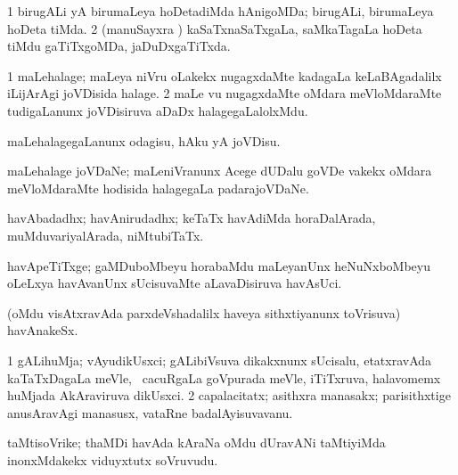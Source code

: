 \bentry
{} 
\gl{\gu}
\expl{}
\bmng
\bnum
\num{1} birugALi yA birumaLeya hoDetadiMda hAnigoMDa; birugALi, birumaLeya hoDeta tiMda. 
\num{2} (manuSayxra \vi) kaSaTxnaSaTxgaLa, saMkaTagaLa hoDeta tiMdu gaTiTxgoMDa, jaDuDxgaTiTxda. 
\enum
\emng
\eentry

\bentry
{} 
\gl{\nA}
\expl{}
\bmng
\bnum
\num{1} maLehalage; maLeya niVru oLakekx nugagxdaMte kadagaLa keLaBAgadalilx iLijArAgi joVDisida halage. 
\num{2} maLe \mo vu nugagxdaMte oMdara meVloMdaraMte tudigaLanunx joVDisiruva aDaDx halagegaLalolxMdu. 
\enum
\emng
\eentry

\bentry
{} 
\gl{\sakirx}
\expl{}
\bmng
maLehalagegaLanunx odagisu, hAku yA joVDisu. 
\emng
\eentry

\bentry
{} 
\gl{\nA}
\expl{}
\bmng
maLehalage joVDaNe; maLeniVranunx Acege dUDalu goVDe \mo vakekx oMdara meVloMdaraMte hodisida halagegaLa padarajoVDaNe. 
\emng
\eentry

\bentry
{} 
\gl{\gu}
\expl{}
\bmng
havAbadadhx; havAnirudadhx; keTaTx havAdiMda horaDalArada, muMduvariyalArada, niMtubiTaTx. 
\emng
\eentry

\bentry
{} 
\gl{\nA}
\expl{}
\bmng
havApeTiTxge; gaMDuboMbeyu horabaMdu maLeyanUnx heNuNxboMbeyu oLeLxya havAvanUnx sUcisuvaMte aLavaDisiruva havAsUci. 
\emng
\eentry

\bentry
{} 
\gl{\nA}
\expl{}
\bmng
(oMdu visAtxravAda parxdeVshadalilx haveya sithxtiyanunx toVrisuva) havAnakeSx. 
\emng
\eentry

{} 
\gl{\nA}
\expl{}
\bmng
\bnum
\num{1} gALihuMja; vAyudikUsxci; gALibiVsuva dikakxnunx sUcisalu, etatxravAda kaTaTxDagaLa meVle, \kanmu\ cacuRgaLa goVpurada meVle, iTiTxruva, halavomemx huMjada AkAraviruva dikUsxci.  
\num{2} capalacitatx; asithxra manasakx; parisithxtige anusAravAgi manasusx, vataRne badalAyisuvavanu. 
\enum
\emng
\eentry

\bentry
{} 
\gl{\nA}
\expl{}
\bmng
taMtisoVrike; thaMDi havAda kAraNa oMdu dUravANi taMtiyiMda inonxMdakekx viduyxtutx soVruvudu. 
\emng
\eentry

